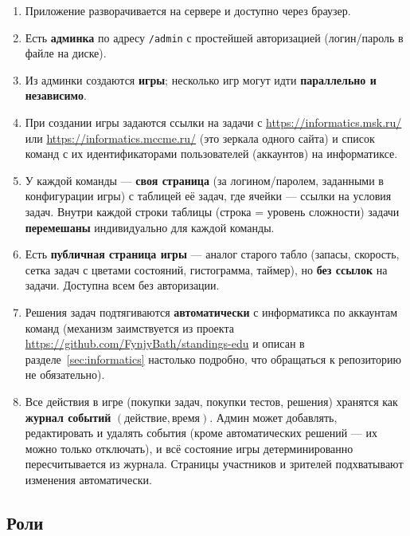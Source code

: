 \documentclass[12pt,a4paper]{article}
\newcommand{\field}[1]{\texttt{#1}}
\begin{document}
\begin{enumerate}[nosep]
  \item Приложение разворачивается на сервере и доступно через браузер.
  \item Есть \textbf{админка} по адресу \field{/admin} с простейшей
        авторизацией (логин/пароль в файле на диске).
  \item Из админки создаются \textbf{игры}; несколько игр могут идти
        \textbf{параллельно и независимо}.
  \item При создании игры задаются ссылки на задачи с
        \url{https://informatics.msk.ru/} или \url{https://informatics.mccme.ru/}
        (это зеркала одного сайта) и список команд с их
        идентификаторами пользователей (аккаунтов) на информатиксе.
  \item У каждой команды --- \textbf{своя страница} (за логином/паролем,
        заданными в конфигурации игры) с таблицей её задач, где ячейки ---
        ссылки на условия задач. Внутри каждой строки таблицы (строка =
        уровень сложности) задачи \textbf{перемешаны} индивидуально для
        каждой команды.
  \item Есть \textbf{публичная страница игры} --- аналог старого табло
        (запасы, скорость, сетка задач с цветами состояний, гистограмма,
        таймер), но \textbf{без ссылок} на задачи. Доступна всем без
        авторизации.
  \item Решения задач подтягиваются \textbf{автоматически} с информатикса
        по аккаунтам команд (механизм заимствуется из проекта
        \url{https://github.com/FynjyBath/standings-edu} и описан в
        разделе~\ref{sec:informatics} настолько подробно, что обращаться к
        репозиторию не обязательно).
  \item Все действия в игре (покупки задач, покупки тестов, решения)
        хранятся как \textbf{журнал событий} \((\text{действие},
        \text{время})\). Админ может добавлять, редактировать и удалять
        события (кроме автоматических решений --- их можно только отключать),
        и всё состояние игры детерминированно пересчитывается из журнала.
        Страницы участников и зрителей подхватывают изменения автоматически.
\end{enumerate}

\subsection{Роли}
\end{document}
